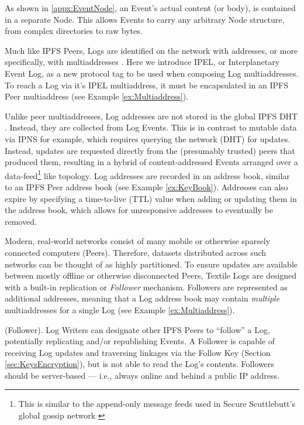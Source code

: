 \documentclass{textile}
\begin{document}
As shown in \ref{appx:EventNode}, an Event's actual content (or body), is contained in a separate Node. This allows Events to carry any arbitrary Node structure, from complex directories to raw bytes.

Much like IPFS Peers, Logs are identified on the network with addresses, or more specifically, with multiaddresses \cite{protocollabsMultiaddr}. Here we introduce IPEL, or Interplanetary Event Log, as a new protocol tag to be used when composing Log multiaddresses. To reach a Log via it's IPEL multiaddress, it must be encapsulated in an IPFS Peer multiaddress (see Example \ref{ex:Multiaddress}).

Unlike peer multiaddresses, Log addresses are not stored in the global IPFS DHT \cite{benetIPFSContentAddressed2014}. Instead, they are collected from Log Events. This is in contrast to mutable data via IPNS for example, which requires querying the network (DHT) for updates. Instead, updates are requested directly from the (presumably trusted) peers that produced them, resulting in a hybrid of content-addressed Events arranged over a data-feed\footnote{This is similar to the append-only message feeds used in Secure Scuttlebutt’s global gossip network \cite{securescuttlebuttScuttlebuttProtocolGuide}} like topology. Log addresses are recorded in an address book, similar to an IPFS Peer address book (see Example \ref{ex:KeyBook}). Addresses can also expire by specifying a time-to-live (TTL) value when adding or updating them in the address book, which allows for unresponsive addresses to eventually be removed.

Modern, real-world networks consist of many mobile or otherwise sparsely connected computers (Peers). Therefore, datasets distributed across such networks can be thought of as highly partitioned. To ensure updates are available between mostly offline or otherwise disconnected Peers, Textile Logs are designed with a built-in replication or \emph{Follower} mechanism. Followers are represented as additional addresses, meaning that a Log address book may contain \emph{multiple} multiaddresses for a single Log (see Example \ref{ex:Multiaddress}).

\begin{definition}
  (Follower). Log Writers can designate other IPFS Peers to ``follow'' a Log, potentially replicating and/or republishing Events. A Follower is capable of receiving Log updates and traversing linkages via the Follow Key (Section  \ref{sec:KeysEncryption}), but is not able to read the Log's contents. Followers should be server-based --- i.e., always online and behind a public IP address.
\end{definition}
\end{document}
